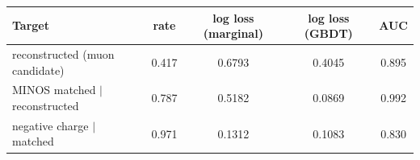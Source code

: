 \begin{tabular}{lcccc}
\toprule
Target & rate & log loss (marginal) & log loss (GBDT) & AUC \\
\midrule
reconstructed (muon candidate) & 0.417 & 0.6793 & 0.4045 & 0.895 \\
MINOS matched $\mid$ reconstructed & 0.787 & 0.5182 & 0.0869 & 0.992 \\
negative charge $\mid$ matched & 0.971 & 0.1312 & 0.1083 & 0.830 \\
\bottomrule
\end{tabular}
